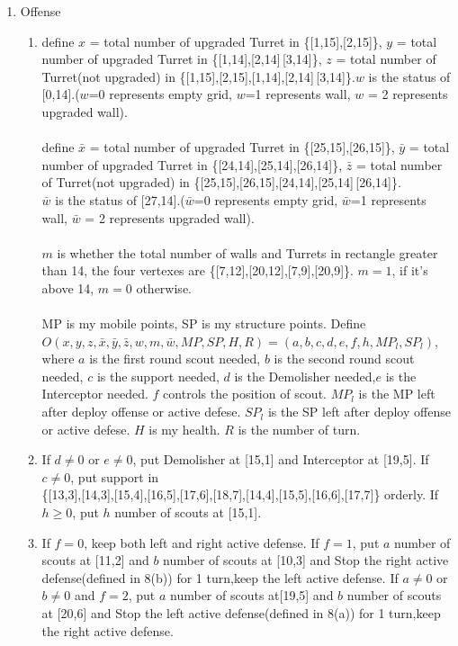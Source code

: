 \documentclass[12pt]{article}
\begin{document}
\begin{enumerate}
\item Offense
\begin{enumerate}
\item define $x$ = total number of upgraded Turret in \{[1,15],[2,15]\}, $y$ = total number of upgraded Turret in \{[1,14],[2,14]\,[3,14]\}, $z$ = total number of Turret(not upgraded) in  \{[1,15],[2,15],[1,14],[2,14]\,[3,14]\}.$w$ is the status of [0,14].($w$=0 represents empty grid, $w$=1 represents wall, $w$ = 2 represents upgraded wall).\\\\define $\bar{x}$ = total number of upgraded Turret in \{[25,15],[26,15]\}, $\bar{y}$ = total number of upgraded Turret in \{[24,14],[25,14],[26,14]\}, $\bar{z}$ = total number of Turret(not upgraded) in  \{[25,15],[26,15],[24,14],[25,14]\,[26,14]\}.\\$\bar{w}$ is the status of [27,14].($\bar{w}$=0 represents empty grid, $\bar{w}$=1 represents wall, $\bar{w}$ = 2 represents upgraded wall).\\\\$m$ is whether the total number of walls and Turrets in rectangle greater than 14, the four vertexes are \{[7,12],[20,12],[7,9],[20,9]\}. $m = 1$, if it's above 14, $m=0$ otherwise.\\  \\MP is my mobile points, SP is my structure points. Define\\ $O(x,y,z,\bar{x},\bar{y},\bar{z},w,m,\bar{w},MP,SP,H,R) = (a,b,c,d,e,f,h,MP_l,SP_l)$, where $a$ is the first round scout needed, $b$ is the second round scout needed, $c$ is the support needed, $d$ is the Demolisher needed,$e$ is the Interceptor needed. $f$ controls the position of scout. $MP_l$ is the MP left after deploy offense or active defese. $SP_l$ is the SP left after deploy offense or active defese. $H$ is my health. $R$ is the number of turn.
\item If $d \neq 0$ or $e \neq 0$, put Demolisher at  [15,1] and Interceptor at [19,5]. If $c \neq 0$, put support in\\ \{[13,3],[14,3],[15,4],[16,5],[17,6],[18,7],[14,4],[15,5],[16,6],[17,7]\} orderly. If $h \geq 0 $, put $h$ number of scouts at [15,1]. 
\item If $f =0$, keep both left and right active defense. If $f =1$, put $a$ number of scouts at [11,2] and $b$ number of scouts at [10,3] and Stop the right active defense(defined in 8(b)) for 1 turn,keep the left active defense. If $a \neq 0$ or $b \neq 0$ and $f =2$, put $a$ number of scouts at[19,5] and $b$ number of scouts at [20,6] and Stop the left active defense(defined in 8(a)) for 1 turn,keep the right active defense.
\end{enumerate}
\end{enumerate}
\end{document}
